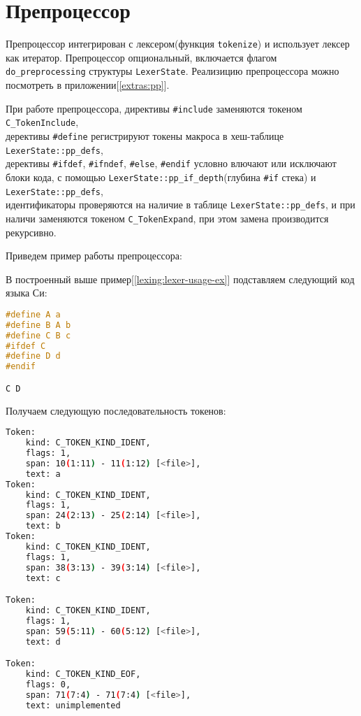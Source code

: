 \clearpage
\section{Препроцессор}
\label{pass:pp}

Препроцессор интегрирован с лексером(функция \verb|tokenize|) и использует лексер как итератор.
Препроцессор опциональный, включается флагом \verb|do_preprocessing| структуры \verb|LexerState|.
Реализицию препроцессора можно посмотреть в приложении[\ref{extras:pp}].

При работе препроцессора, директивы \verb|#include| заменяются токеном \verb|C_TokenInclude|, \\
дерективы \verb|#define| регистрируют токены макроса в хеш-таблице \verb|LexerState::pp_defs|, \\
дерективы \verb|#ifdef|, \verb|#ifndef|, \verb|#else|, \verb|#endif| условно влючают или исключают блоки кода, 
с помощью \verb|LexerState::pp_if_depth|(глубина \verb|#if| стека) и \verb|LexerState::pp_defs|, \\
идентификаторы проверяются на наличие в таблице \verb|LexerState::pp_defs|, и при наличи заменяются токеном \verb|C_TokenExpand|,
при этом замена производится рекурсивно.

Приведем пример работы препроцессора:

В построенный выше пример[\ref{lexing:lexer-usage-ex}] подставляем следующий код языка Си:
\begin{lstlisting}[language=c, caption={Входные данные примера}, label={lexing:pp:ex-in}]
#define A a
#define B A b
#define C B c
#ifdef C
#define D d
#endif

C D
\end{lstlisting}

Получаем следующую последовательность токенов:
\begin{lstlisting}[language=bash, caption={Выходные данные примера}, label={lexing:pp:ex-out}]
Token:
    kind: C_TOKEN_KIND_IDENT,
    flags: 1,
    span: 10(1:11) - 11(1:12) [<file>],
    text: a
Token:
    kind: C_TOKEN_KIND_IDENT,
    flags: 1,
    span: 24(2:13) - 25(2:14) [<file>],
    text: b
Token:
    kind: C_TOKEN_KIND_IDENT,
    flags: 1,
    span: 38(3:13) - 39(3:14) [<file>],
    text: c

Token:
    kind: C_TOKEN_KIND_IDENT,
    flags: 1,
    span: 59(5:11) - 60(5:12) [<file>],
    text: d

Token:
    kind: C_TOKEN_KIND_EOF,
    flags: 0,
    span: 71(7:4) - 71(7:4) [<file>],
    text: unimplemented
\end{lstlisting}

